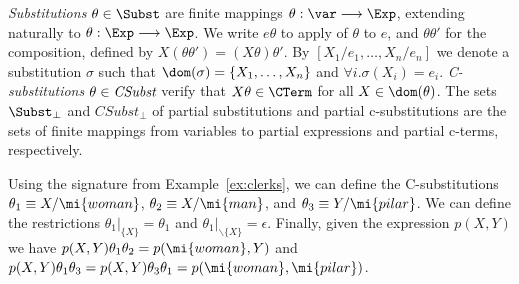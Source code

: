 {\em Substitutions} $\theta \in \Subst$ are finite mappings $\theta:\var
\longrightarrow \Exp$, extending naturally to $\theta:\Exp \longrightarrow
\Exp$.   
We write $e\theta$ to apply of $\theta$ to $e$, and $\theta\theta'$
for the composition, defined by $X(\theta\theta') = (X\theta)\theta'$. 
By $[X_1/e_1, \ldots, X_n/e_n]$ we denote a substitution $\sigma$ such that $\dom(\sigma) = \{X_1, \ldots, X_n\}$ and $\forall i. \sigma(X_i) = e_i$.  
\emph{C-substitutions}
$\theta \in \emph{CSubst}$ verify that $X\theta \in \CTerm$ for all $X\in \dom(\theta)$.  The sets $\Subst_\perp$ and $CSubst_\perp$ of partial substitutions and partial c-substitutions are the sets of finite mappings from variables to partial expressions and partial c-terms, respectively. 


\begin{example}
Using the signature from Example~\ref{ex:clerks}, we can define the C-substitutions
$\theta_1 \equiv X / \mi{woman}$, $\theta_2 \equiv X / \mi{man}$,
and $\theta_3 \equiv Y / \mi{pilar}$. We can define the restrictions 
$\theta_1|_{\{X\}} = \theta_1$ and
$\theta_1|_{\backslash \{X\}} = \epsilon$.
Finally, given the expression $p(X, Y)$ we have
$p(X, Y)\theta_1\theta_2 = p(\mi{woman}, Y)$
and
$p(X, Y)\theta_1\theta_3 = p(X, Y)\theta_3\theta_1 = p(\mi{woman}, \mi{pilar})$.
\end{example}

